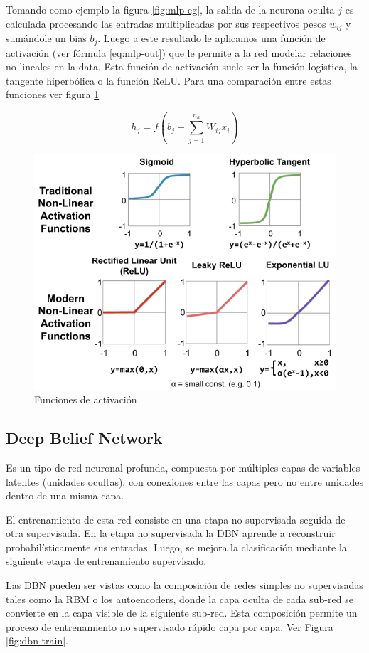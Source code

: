 Tomando como ejemplo la figura \ref{fig:mlp-eg}, la salida de la neurona oculta $j$ es calculada procesando las entradas multiplicadas por sus respectivos pesos $w_{ij}$ y sumándole un bias $b_j$. Luego a este resultado le aplicamos una función de activación (ver fórmula \ref{eq:mlp-out}) que le permite a la red modelar relaciones no lineales en la data. Esta función de activación suele ser la función logistica, la tangente hiperbólica o la función \ac{ReLU}. Para una comparación entre estas funciones ver figura \ref{fig:mlp-activation}

\begin{equation}
    \label{eq:mlp-out}
    h_j = f(b_j + \sum_{j=1}^{n_h} W_{ij} x_i)
\end{equation}

\begin{figure}
    \centering
    \caption{Funciones de activación}
    \label{fig:mlp-activation}
    \includegraphics[width=0.6\linewidth]{graficos/mlp_activation_functions.png}
\end{figure}

\subsection{Deep Belief Network}

Es un tipo de red neuronal profunda, compuesta por múltiples capas de variables latentes (unidades ocultas), con conexiones entre las capas pero no entre unidades dentro de una misma capa.

El entrenamiento de esta red consiste en una etapa no supervisada seguida de otra supervisada. En la etapa no supervisada la \ac{DBN} aprende a reconstruir probabilísticamente sus entradas. Luego, se mejora la clasificación mediante la siguiente etapa de entrenamiento supervisado.

Las \ac{DBN} pueden ser vistas como la composición de redes simples no supervisadas tales como la \ac{RBM} o los autoencoders, donde la capa oculta de cada sub-red se convierte en la capa visible de la siguiente sub-red. Esta composición permite un proceso de entrenamiento no supervisado rápido capa por capa. Ver Figura \ref{fig:dbn-train}.

